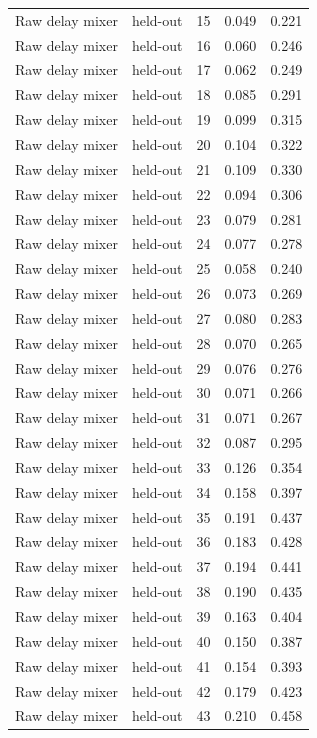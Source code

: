 \begin{tabular}{llrrr}
Raw delay mixer & held-out & 15 & 0.049 & 0.221 \\
Raw delay mixer & held-out & 16 & 0.060 & 0.246 \\
Raw delay mixer & held-out & 17 & 0.062 & 0.249 \\
Raw delay mixer & held-out & 18 & 0.085 & 0.291 \\
Raw delay mixer & held-out & 19 & 0.099 & 0.315 \\
Raw delay mixer & held-out & 20 & 0.104 & 0.322 \\
Raw delay mixer & held-out & 21 & 0.109 & 0.330 \\
Raw delay mixer & held-out & 22 & 0.094 & 0.306 \\
Raw delay mixer & held-out & 23 & 0.079 & 0.281 \\
Raw delay mixer & held-out & 24 & 0.077 & 0.278 \\
Raw delay mixer & held-out & 25 & 0.058 & 0.240 \\
Raw delay mixer & held-out & 26 & 0.073 & 0.269 \\
Raw delay mixer & held-out & 27 & 0.080 & 0.283 \\
Raw delay mixer & held-out & 28 & 0.070 & 0.265 \\
Raw delay mixer & held-out & 29 & 0.076 & 0.276 \\
Raw delay mixer & held-out & 30 & 0.071 & 0.266 \\
Raw delay mixer & held-out & 31 & 0.071 & 0.267 \\
Raw delay mixer & held-out & 32 & 0.087 & 0.295 \\
Raw delay mixer & held-out & 33 & 0.126 & 0.354 \\
Raw delay mixer & held-out & 34 & 0.158 & 0.397 \\
Raw delay mixer & held-out & 35 & 0.191 & 0.437 \\
Raw delay mixer & held-out & 36 & 0.183 & 0.428 \\
Raw delay mixer & held-out & 37 & 0.194 & 0.441 \\
Raw delay mixer & held-out & 38 & 0.190 & 0.435 \\
Raw delay mixer & held-out & 39 & 0.163 & 0.404 \\
Raw delay mixer & held-out & 40 & 0.150 & 0.387 \\
Raw delay mixer & held-out & 41 & 0.154 & 0.393 \\
Raw delay mixer & held-out & 42 & 0.179 & 0.423 \\
Raw delay mixer & held-out & 43 & 0.210 & 0.458 \\

\end{tabular}
